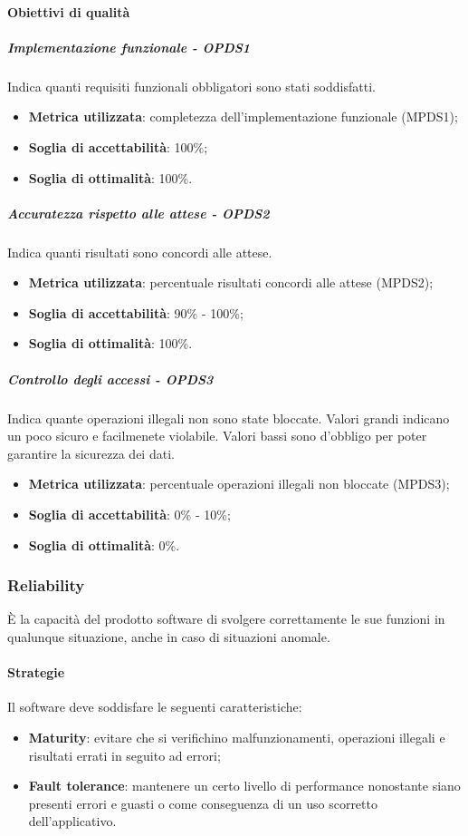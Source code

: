 \documentclass[PdQ.tex]{subfiles}
\begin{document}
			\paragraph{Obiettivi di qualità}
				\subparagraph{Implementazione funzionale - OPDS1}
				Indica quanti requisiti funzionali obbligatori sono stati soddisfatti.
				\begin{itemize}
					\item \textbf{Metrica utilizzata}: completezza dell'implementazione funzionale (MPDS1);
					\item \textbf{Soglia di accettabilità}: 100\%;
					\item \textbf{Soglia di ottimalità}: 100\%.
				\end{itemize}

				\subparagraph{Accuratezza rispetto alle attese - OPDS2}
				Indica quanti risultati sono concordi alle attese.
				\begin{itemize}
					\item \textbf{Metrica utilizzata}: percentuale risultati concordi alle attese (MPDS2);
					\item \textbf{Soglia di accettabilità}: 90\% - 100\%;
					\item \textbf{Soglia di ottimalità}: 100\%.
				\end{itemize}

				\subparagraph{Controllo degli accessi - OPDS3}
				Indica quante operazioni illegali non sono state bloccate. Valori grandi indicano un  poco sicuro e facilmenete violabile.
				Valori bassi sono d'obbligo per poter garantire la sicurezza dei dati.
				\begin{itemize}
					\item \textbf{Metrica utilizzata}: percentuale operazioni illegali non bloccate (MPDS3);
					\item \textbf{Soglia di accettabilità}: 0\% - 10\%;
					\item \textbf{Soglia di ottimalità}: 0\%.
				\end{itemize}

		\subsubsection{Reliability}
		È la capacità del prodotto software di svolgere correttamente le sue funzioni in qualunque situazione, anche in caso di situazioni anomale.

			\paragraph{Strategie}
			Il software deve soddisfare le seguenti caratteristiche:
			\begin{itemize}
				\item \textbf{Maturity}: evitare che si verifichino malfunzionamenti, operazioni illegali e risultati errati in seguito ad errori;
				\item \textbf{Fault tolerance}: mantenere un certo livello di performance nonostante siano presenti errori e guasti o come conseguenza di un uso scorretto dell'applicativo.
			\end{itemize}
\end{document}
